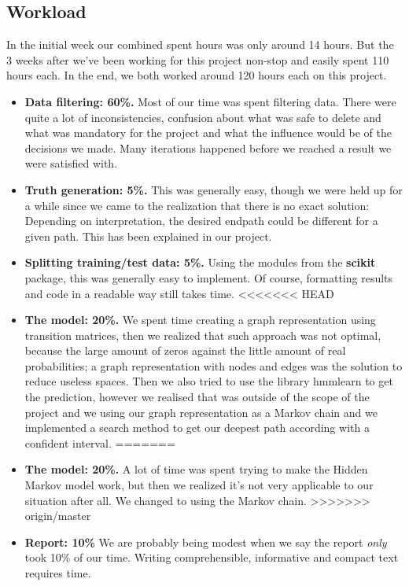 \begin{appendices}

\section{Workload}

In the initial week our combined spent hours was only around 14 hours. But the 3 weeks after we've been working for this project non-stop and easily spent 110 hours each. In the end, we both worked around 120 hours each on this project.
\begin{itemize}
	\item \textbf{Data filtering: 60\%.} Most of our time was spent filtering data. There were quite a lot of inconsistencies, confusion about what was safe to delete and what was mandatory for the project and what the influence would be of the decisions we made. Many iterations happened before we reached a result we were satisfied with.
	\item \textbf{Truth generation: 5\%.} This was generally easy, though we were held up for a while since we came to the realization that there is no exact solution: Depending on interpretation, the desired endpath could be different for a given path. This has been explained in our project.
	\item \textbf{Splitting training/test data: 5\%.} Using the modules from the \textbf{scikit} package, this was generally easy to implement. Of course, formatting results and code in a readable way still takes time.
<<<<<<< HEAD
	\item \textbf{The model: 20\%.} We spent time creating a graph representation using transition matrices, then we realized that such approach was not optimal, because the large amount of zeros against the little amount of real probabilities; a graph representation with nodes and edges was the solution to reduce useless spaces. Then we also tried to use the library hmmlearn to get the prediction, however we realised that was outside of the scope of the project and we using our graph representation as a Markov chain and we implemented a search method to get our deepest path according with a confident interval.
=======
	\item \textbf{The model: 20\%.} A lot of time was spent trying to make the Hidden Markov model work, but then we realized it's not very applicable to our situation after all.  We changed to using the Markov chain.
>>>>>>> origin/master
	\item \textbf{Report: 10\%} We are probably being modest when we say the report \textit{only} took 10\% of our time. Writing comprehensible, informative and compact text requires time.
\end{itemize} 

\end{appendices}